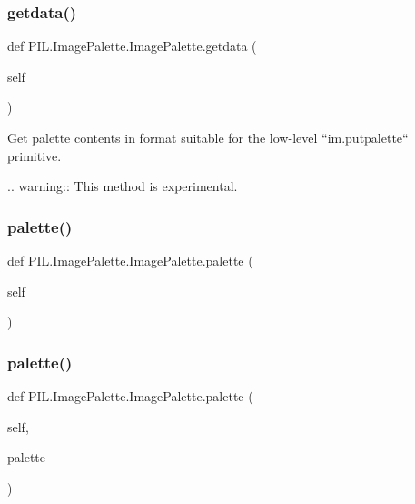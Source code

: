 \subsubsection{\texorpdfstring{getdata()}{getdata()}}
{\footnotesize\ttfamily def P\+I\+L.\+Image\+Palette.\+Image\+Palette.\+getdata (\begin{DoxyParamCaption}\item[{}]{self }\end{DoxyParamCaption})}

\begin{DoxyVerb}Get palette contents in format suitable for the low-level
``im.putpalette`` primitive.

.. warning:: This method is experimental.
\end{DoxyVerb}
 \mbox{\label{classPIL_1_1ImagePalette_1_1ImagePalette_a7884b919befb2fd9aacaa4bfeeb47e1c}} 
\subsubsection{\texorpdfstring{palette()}{palette()}\hspace{0.1cm}{\footnotesize\ttfamily [1/2]}}
{\footnotesize\ttfamily def P\+I\+L.\+Image\+Palette.\+Image\+Palette.\+palette (\begin{DoxyParamCaption}\item[{}]{self }\end{DoxyParamCaption})}

\mbox{\label{classPIL_1_1ImagePalette_1_1ImagePalette_aed828437d59530fe7bb008fb3b57eedb}} 
\subsubsection{\texorpdfstring{palette()}{palette()}\hspace{0.1cm}{\footnotesize\ttfamily [2/2]}}
{\footnotesize\ttfamily def P\+I\+L.\+Image\+Palette.\+Image\+Palette.\+palette (\begin{DoxyParamCaption}\item[{}]{self,  }\item[{}]{palette }\end{DoxyParamCaption})}

